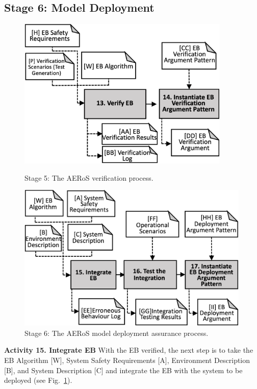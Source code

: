 \documentclass[runningheads]{llncs}
\begin{document}
\subsection{Stage 6: Model Deployment} \label{framework-stage6}
\begin{figure}[!t]
	\centering
	\begin{minipage}[b]{.48\textwidth}
		\centering
		\includegraphics[width=0.9\textwidth]{figures/AERoS-Stage5.png}%
		\vspace{-2ex}
		\caption{Stage 5: The AERoS verification process.}
		\label{amlas-a-stage5}
      \end{minipage}%
      \hspace*{0.02\textwidth}
	\begin{minipage}[b]{.48\textwidth}
		\centering
		\includegraphics[width=0.99\textwidth]{figures/AERoS-Stage6.png}%
		\vspace{-2ex}
		\caption{Stage 6: The AERoS model \newline deployment assurance process.}
		\label{amlas-a-stage6}
	\end{minipage}
	\vspace{-4ex}
\end{figure}
\noindent\textbf{Activity 15. Integrate EB} With the EB verified, the next step is to take the EB Algorithm [W], System Safety Requirements [A], Environment Description [B], and System Description [C] and integrate the EB with the system to be deployed (see Fig.~\ref{amlas-a-stage6}). 
\end{document}
